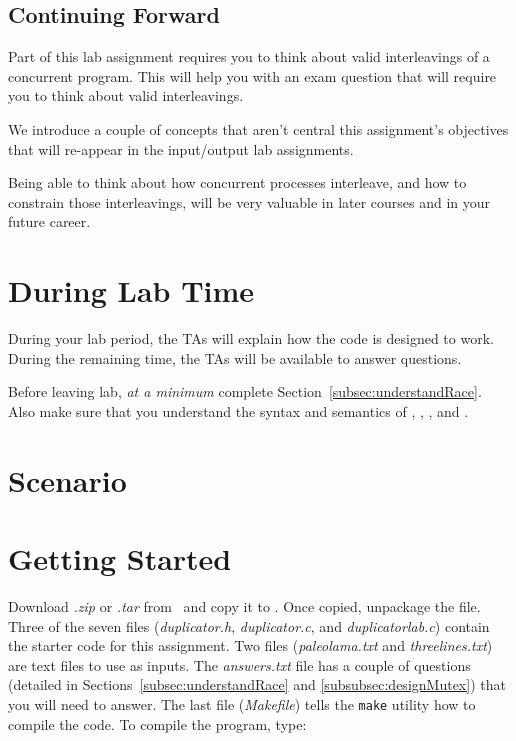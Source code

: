     \subsection*{Continuing Forward}

    Part of this lab assignment requires you to think about valid interleavings of a concurrent program.
    This will help you with an exam question that will require you to think about valid interleavings.

    We introduce a couple of concepts that aren't central this assignment's objectives that will re-appear in the input/output lab assignments.

    Being able to think about how concurrent processes interleave, and how to constrain those interleavings, will be very valuable in later courses and in your future career.

    \section*{During Lab Time}

    During your lab period, the TAs will explain how the code is designed to work.
    During the remaining time, the TAs will be available to answer questions.


    Before leaving lab, \textit{at a minimum} complete Section~\ref{subsec:understandRace}.
    Also make sure that you understand the syntax and semantics of , , , and .



    \section{Scenario}

    \PickingUpNewmansProject


    \section{Getting Started}

    Download \textit{\shortlabname.zip} or \textit{\shortlabname.tar} from \filesource\ and copy it to \runtimeenvironment.
    Once copied, unpackage the file.
    Three of the seven files (\textit{duplicator.h}, \textit{duplicator.c}, and \textit{duplicatorlab.c}) contain the starter code for this assignment.
    Two files (\textit{paleolama.txt} and \textit{threelines.txt}) are text files to use as inputs.
    The \textit{answers.txt} file has a couple of questions (detailed in Sections~\ref{subsec:understandRace} and \ref{subsubsec:designMutex}) that you will need to answer.
    The last file (\textit{Makefile}) tells the \texttt{make} utility how to compile the code.
    To compile the program, type:

